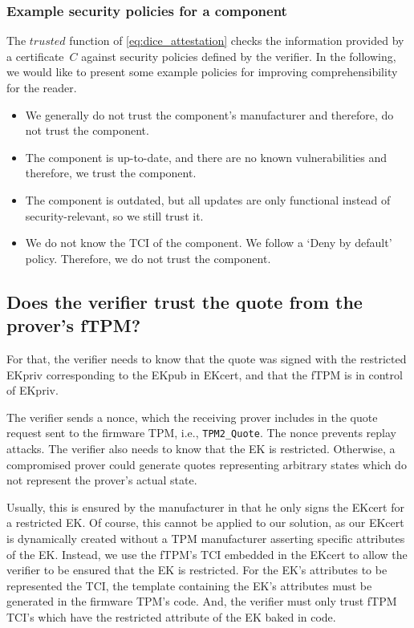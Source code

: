 \subsubsection{Example security policies for a component}

The \(trusted\) function of \autoref{eq:dice_attestation} checks the information provided by a certificate~\(C\) against security policies defined by the verifier.
In the following, we would like to present some example policies for improving comprehensibility for the reader.

\begin{itemize}
    \item We generally do not trust the component's manufacturer and therefore, do not trust the component.
    \item The component is up-to-date, and there are no known vulnerabilities and therefore, we trust the component.
    \item The component is outdated, but all updates are only functional instead of security-relevant, so we still trust it.
    \item We do not know the TCI of the component. We follow a `Deny by default' policy. Therefore, we do not trust the component.
\end{itemize}

\subsection{Does the verifier trust the quote from the prover's fTPM?}\label{subsec:trust_quote_from_prover}

For that, the verifier needs to know that the quote was signed with the restricted EKpriv corresponding to the EKpub in EKcert, and that the fTPM is in control of EKpriv.

The verifier sends a nonce, which the receiving prover includes in the quote request sent to the firmware TPM, i.e., \texttt{TPM2\_Quote}.
The nonce prevents replay attacks.
The verifier also needs to know that the EK is restricted.
Otherwise, a compromised prover could generate quotes representing arbitrary states which do not represent the prover's actual state.

Usually, this is ensured by the manufacturer in that he only signs the EKcert for a restricted EK\@.
Of course, this cannot be applied to our solution, as our EKcert is dynamically created without a TPM manufacturer asserting specific attributes of the EK\@.
Instead, we use the fTPM's TCI embedded in the EKcert to allow the verifier to be ensured that the EK is restricted.
For the EK's attributes to be represented the TCI, the template containing the EK's attributes must be generated in the firmware TPM's code.
And, the verifier must only trust fTPM TCI's which have the restricted attribute of the EK baked in code.

